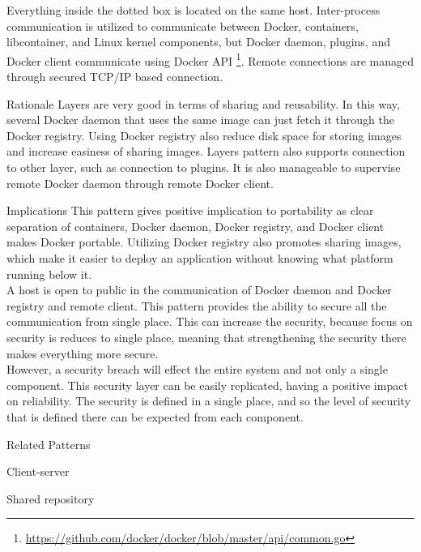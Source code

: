 \begin{patdescription}
Everything inside the dotted box is located on the same host. Inter-process communication is utilized to communicate between Docker, containers, libcontainer, and Linux kernel components, but Docker daemon, plugins, and Docker client communicate using Docker API
\footnote{\url{https://github.com/docker/docker/blob/master/api/common.go}}. Remote connections are managed through secured TCP/IP based connection.

\item [Rationale] 
Layers are very good in terms of sharing and reusability. In this way, several Docker daemon that uses the same image can just fetch it through the Docker registry. Using Docker registry also reduce disk space for storing images and increase easiness of sharing images. Layers pattern also supports connection to other layer, such as connection to plugins. It is also manageable to supervise remote Docker daemon through remote Docker client.

\item [Implications] 
This pattern gives positive implication to portability as clear separation of containers, Docker daemon, Docker registry, and Docker client makes Docker portable. Utilizing Docker registry also promotes sharing images, which make it easier to deploy an application without knowing what platform running below it.\\
A host is open to public in the communication of Docker daemon and Docker registry and remote client. This pattern provides the ability to secure all the communication from single place. This can increase the security, because focus on security is reduces to single place, meaning that strengthening the security there makes everything more secure. \\ 
However, a security breach will effect the entire system and not only a single component. This security layer can be easily replicated, having a positive impact on reliability. The security is defined in a single place, and so the level of security that is defined there can be expected from each component. 

\item [Related Patterns]
\begin{mynesteditemlist}
	\item Client-server
	\item Shared repository
\end{mynesteditemlist}

\end{patdescription}



